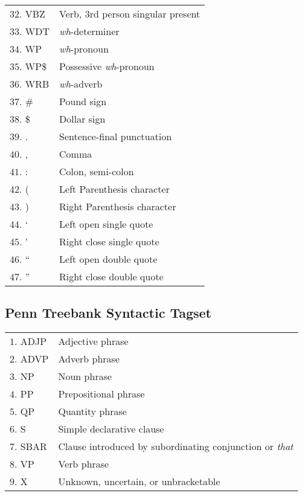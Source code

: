 \begin{tabular}{p{4.5cm}l}
$32$. VBZ &   Verb, 3rd person singular present\\
$33$. WDT &   \emph{wh}-determiner\\
$34$. WP &  \emph{wh}-pronoun\\
$35$. WP\$ &   Possessive \emph{wh}-pronoun\\
$36$. WRB &   \emph{wh}-adverb\\
$37$. \# &   Pound sign\\
$38$. \$ &   Dollar sign\\
$39$. . &   Sentence-final punctuation\\
$40$. , &   Comma\\
$41$. : &   Colon, semi-colon\\
$42$. ( &   Left Parenthesis character\\
$43$. ) &   Right Parenthesis character\\
$44$. ` &   Left open single quote\\
$45$. ' &   Right close single quote\\
$46$. `` &   Left open double quote\\
$47$. '' &   Right close double quote\\
\end{tabular}

\subsection{Penn Treebank Syntactic Tagset}
\begin{tabular}{p{4.5cm}l}
$1$. \hphantom{1}ADJP &  Adjective phrase\\
$2$.  \hphantom{1}ADVP &  Adverb phrase\\
$3$. \hphantom{1}NP &  Noun phrase\\
$4$. \hphantom{1}PP &  Prepositional phrase\\
$5$. \hphantom{1}QP &  Quantity phrase\\
$6$. \hphantom{1}S &  Simple declarative clause\\
$7$. \hphantom{1}SBAR &  Clause introduced by subordinating conjunction or \emph{that}\\
$8$. \hphantom{1}VP &  Verb phrase\\
$9$. \hphantom{1}X &  Unknown, uncertain, or unbracketable\\
\end{tabular}
